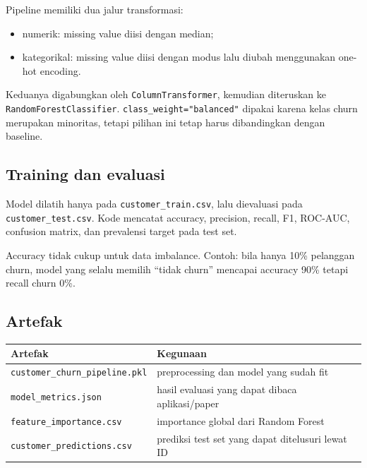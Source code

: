 \documentclass[
  indonesian,
  letterpaper,
  DIV=11,
  numbers=noendperiod]{scrreprt}
\newcounter{none} %
\providecommand{\tightlist}{%
  \setlength{\itemsep}{0pt}\setlength{\parskip}{0pt}}
\begin{document}
Pipeline memiliki dua jalur transformasi:

\begin{itemize}
\tightlist
\item
  numerik: missing value diisi dengan median;
\item
  kategorikal: missing value diisi dengan modus lalu diubah menggunakan
  one-hot encoding.
\end{itemize}

Keduanya digabungkan oleh \texttt{ColumnTransformer}, kemudian
diteruskan ke \texttt{RandomForestClassifier}.
\texttt{class\_weight="balanced"} dipakai karena kelas churn merupakan
minoritas, tetapi pilihan ini tetap harus dibandingkan dengan baseline.

\subsection{Training dan evaluasi}\label{training-dan-evaluasi}

Model dilatih hanya pada \texttt{customer\_train.csv}, lalu dievaluasi
pada \texttt{customer\_test.csv}. Kode mencatat accuracy, precision,
recall, F1, ROC-AUC, confusion matrix, dan prevalensi target pada test
set.

Accuracy tidak cukup untuk data imbalance. Contoh: bila hanya 10\%
pelanggan churn, model yang selalu memilih ``tidak churn'' mencapai
accuracy 90\% tetapi recall churn 0\%.

\subsection{Artefak}\label{artefak}

{\def\LTcaptype{none} %
\begin{longtable}[]{@{}
  >{\raggedright\arraybackslash}p{}
  >{\raggedright\arraybackslash}p{}@{}}
\toprule\noalign{}
\begin{minipage}[b]{\linewidth}\raggedright
Artefak
\end{minipage} & \begin{minipage}[b]{\linewidth}\raggedright
Kegunaan
\end{minipage} \\
\midrule\noalign{}
\endhead
\bottomrule\noalign{}
\endlastfoot
\texttt{customer\_churn\_pipeline.pkl} & preprocessing dan model yang
sudah fit \\
\texttt{model\_metrics.json} & hasil evaluasi yang dapat dibaca
aplikasi/paper \\
\texttt{feature\_importance.csv} & importance global dari Random
Forest \\
\texttt{customer\_predictions.csv} & prediksi test set yang dapat
ditelusuri lewat ID \\
\end{longtable}
}
\end{document}
